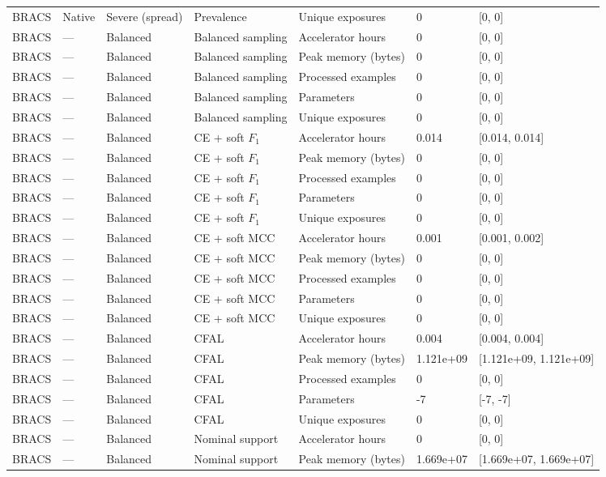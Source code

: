\begin{longtable}{lllllll}
BRACS & Native & Severe (spread) & Prevalence & Unique exposures & 0 & [0, 0] \\
BRACS & --- & Balanced & Balanced sampling & Accelerator hours & 0 & [0, 0] \\
BRACS & --- & Balanced & Balanced sampling & Peak memory (bytes) & 0 & [0, 0] \\
BRACS & --- & Balanced & Balanced sampling & Processed examples & 0 & [0, 0] \\
BRACS & --- & Balanced & Balanced sampling & Parameters & 0 & [0, 0] \\
BRACS & --- & Balanced & Balanced sampling & Unique exposures & 0 & [0, 0] \\
BRACS & --- & Balanced & CE + soft $F_1$ & Accelerator hours & 0.014 & [0.014, 0.014] \\
BRACS & --- & Balanced & CE + soft $F_1$ & Peak memory (bytes) & 0 & [0, 0] \\
BRACS & --- & Balanced & CE + soft $F_1$ & Processed examples & 0 & [0, 0] \\
BRACS & --- & Balanced & CE + soft $F_1$ & Parameters & 0 & [0, 0] \\
BRACS & --- & Balanced & CE + soft $F_1$ & Unique exposures & 0 & [0, 0] \\
BRACS & --- & Balanced & CE + soft MCC & Accelerator hours & 0.001 & [0.001, 0.002] \\
BRACS & --- & Balanced & CE + soft MCC & Peak memory (bytes) & 0 & [0, 0] \\
BRACS & --- & Balanced & CE + soft MCC & Processed examples & 0 & [0, 0] \\
BRACS & --- & Balanced & CE + soft MCC & Parameters & 0 & [0, 0] \\
BRACS & --- & Balanced & CE + soft MCC & Unique exposures & 0 & [0, 0] \\
BRACS & --- & Balanced & CFAL & Accelerator hours & 0.004 & [0.004, 0.004] \\
BRACS & --- & Balanced & CFAL & Peak memory (bytes) & 1.121e+09 & [1.121e+09, 1.121e+09] \\
BRACS & --- & Balanced & CFAL & Processed examples & 0 & [0, 0] \\
BRACS & --- & Balanced & CFAL & Parameters & -7 & [-7, -7] \\
BRACS & --- & Balanced & CFAL & Unique exposures & 0 & [0, 0] \\
BRACS & --- & Balanced & Nominal support & Accelerator hours & 0 & [0, 0] \\
BRACS & --- & Balanced & Nominal support & Peak memory (bytes) & 1.669e+07 & [1.669e+07, 1.669e+07] \\

\end{longtable}
